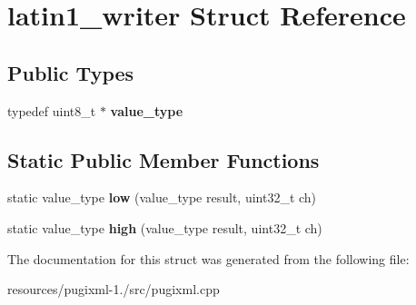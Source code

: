 \hypertarget{structlatin1__writer}{\section{latin1\+\_\+writer Struct Reference}
\label{structlatin1__writer}
}
\subsection*{Public Types}
\begin{DoxyCompactItemize}
\item 
\hypertarget{structlatin1__writer_af9228600fa7eecd793cc3d927d46eb1a}{typedef uint8\+\_\+t $\ast$ {\bfseries value\+\_\+type}}\label{structlatin1__writer_af9228600fa7eecd793cc3d927d46eb1a}

\end{DoxyCompactItemize}
\subsection*{Static Public Member Functions}
\begin{DoxyCompactItemize}
\item 
\hypertarget{structlatin1__writer_ab5d7a833d29d66031420686ca67b1f6e}{static value\+\_\+type {\bfseries low} (value\+\_\+type result, uint32\+\_\+t ch)}\label{structlatin1__writer_ab5d7a833d29d66031420686ca67b1f6e}

\item 
\hypertarget{structlatin1__writer_a0e48c306ebe556f267404a9624f00554}{static value\+\_\+type {\bfseries high} (value\+\_\+type result, uint32\+\_\+t ch)}\label{structlatin1__writer_a0e48c306ebe556f267404a9624f00554}

\end{DoxyCompactItemize}


The documentation for this struct was generated from the following file\+:\begin{DoxyCompactItemize}
\item 
resources/pugixml-\/1./src/pugixml.\+cpp\end{DoxyCompactItemize}
